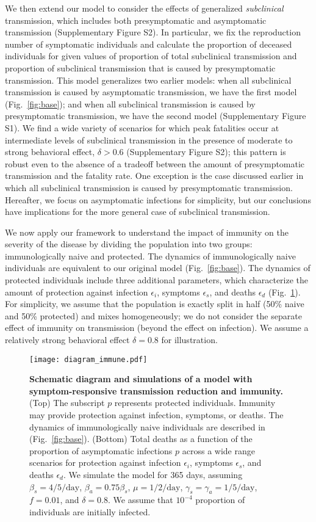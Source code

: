\documentclass[12pt]{article}
\newcommand{\fref}[1]{Fig.~\ref{fig:#1}}
\begin{document}
We then extend our model to consider the effects of generalized \textit{subclinical} transmission, which includes both presymptomatic and asymptomatic transmission (Supplementary Figure S2).
In particular, we fix the reproduction number of symptomatic individuals and calculate the proportion of deceased individuals for given values of proportion of total subclinical transmission and proportion of subclinical transmission that is caused by presymptomatic transmission.
This model generalizes two earlier models:
when all subclinical transmission is caused by asymptomatic transmission, we have the first model (\fref{base});
and when all subclinical transmission is caused by presymptomatic transmission, we have the second model (Supplementary Figure S1).
We find a wide variety of scenarios for which peak fatalities occur at intermediate levels of subclinical transmission in the presence of moderate to strong behavioral effect, $\delta > 0.6$ (Supplementary Figure S2);
this pattern is robust even to the absence of a tradeoff between the amount of presymptomatic transmission and the fatality rate.
One exception is the case discussed earlier in which all subclinical transmission is caused by presymptomatic transmission.
Hereafter, we focus on asymptomatic infections for simplicity, but our conclusions have implications for the more general case of subclinical transmission.

We now apply our framework to understand the impact of immunity on the severity of the disease by dividing the population into two groups: immunologically naive and protected.
The dynamics of immunologically naive individuals are equivalent to our original model (\fref{base}).
The dynamics of protected individuals include three additional parameters, which characterize the amount of protection against infection $\epsilon_i$, symptoms $\epsilon_s$, and deaths $\epsilon_d$ (\fref{immune}).
For simplicity, we assume that the population is exactly split in half (50\% naive and 50\% protected) and mixes homogeneously; we do not consider the separate effect of immunity on transmission (beyond the effect on infection).
We assume a relatively strong behavioral effect $\delta=0.8$ for illustration.

\begin{figure}[!ht]
\texttt{[image: diagram\_immune.pdf]}
\caption{
\textbf{Schematic diagram and simulations of a model with symptom-responsive transmission reduction and immunity.}
(Top) The subscript $p$ represents protected individuals. 
Immunity may provide protection against infection, symptoms, or deaths.
The dynamics of immunologically naive individuals are described in (\fref{base}).
(Bottom) Total deaths as a function of the proportion of asymptomatic infections $p$ across a wide range scenarios for protection against infection $\epsilon_i$, symptoms $\epsilon_s$, and deaths $\epsilon_d$.
We simulate the model for 365 days, assuming $\beta_s = 4/5/\mathrm{day}$, $\beta_a = 0.75 \beta_s$, $\mu=1/2/\mathrm{day}$, $\gamma_s=\gamma_a=1/5/\mathrm{day}$, $f=0.01$, and $\delta=0.8$.
We assume that $10^{-4}$ proportion of individuals are initially infected.
}
\label{fig:immune}
\end{figure}
\end{document}
